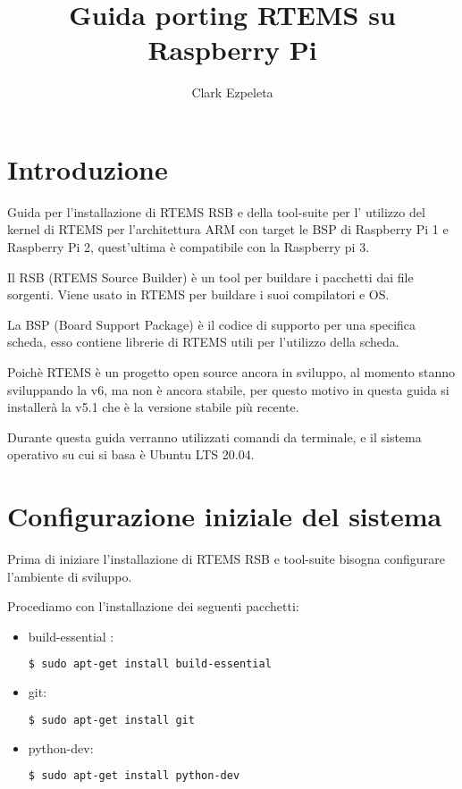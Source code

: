 \documentclass[10pt, a4paper]{article}
\title{Guida porting RTEMS su Raspberry Pi}
\author{Clark Ezpeleta}
\begin{document}
\maketitle
\newpage
\tableofcontents
\newpage
{}
\begin{flushleft}
\section{Introduzione}
Guida per l'installazione di RTEMS RSB e della tool-suite per l' utilizzo del kernel di RTEMS per l'architettura ARM con target le BSP di Raspberry Pi 1 e Raspberry Pi 2, quest'ultima è compatibile con la Raspberry pi 3.

Il RSB (RTEMS Source Builder) è un tool per buildare i pacchetti dai file sorgenti. Viene usato in RTEMS per buildare i suoi compilatori e OS.

La BSP (Board Support Package) è il codice di supporto per una specifica scheda, esso contiene librerie di RTEMS utili per l'utilizzo della scheda.

Poichè RTEMS è un progetto open source ancora in sviluppo, al momento stanno sviluppando la v6, ma non è ancora stabile, per questo motivo in questa guida si installerà la v5.1 che è la versione stabile più recente.

Durante questa guida verranno utilizzati comandi da terminale, e il sistema operativo su cui si basa è Ubuntu LTS 20.04.


\newpage
\section{Configurazione iniziale del sistema}
Prima di iniziare l'installazione di RTEMS RSB e tool-suite bisogna configurare l'ambiente di sviluppo.

Procediamo con l'installazione dei seguenti pacchetti:
\begin{itemize}
\item  build-essential : 
\begin{lstlisting}[language=bash] 
$ sudo apt-get install build-essential
\end{lstlisting}
\item git:
\begin{lstlisting}[language=bash] 
$ sudo apt-get install git
\end{lstlisting}
\item python-dev:
\begin{lstlisting}[language=bash] 
 $ sudo apt-get install python-dev
 \end{lstlisting}
\end{itemize}


\end{flushleft}
\end{document}
